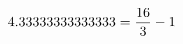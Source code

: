 \documentclass[preview]{standalone}
\begin{document}
\begin{align*}
\special{dvisvgm:raw <g id='unique000'>}4.33333333333333 = \frac{16}{3} - 1\special{dvisvgm:raw </g>}
\end{align*}
\end{document}
